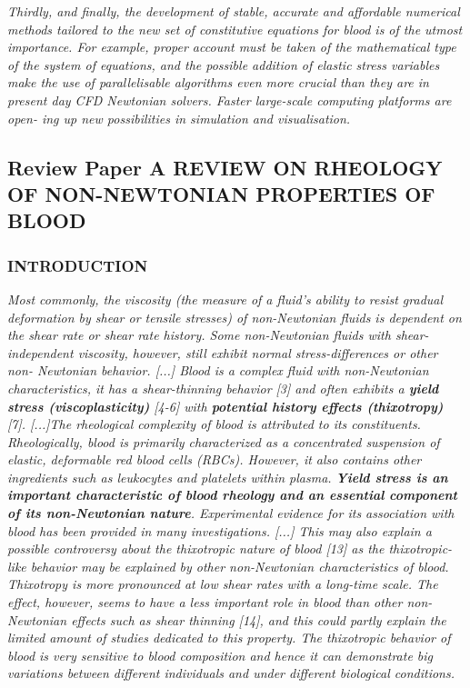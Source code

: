 \documentclass[11pt,letterpaper]{article}
\begin{document}
\textit{Thirdly, and finally, the development of stable, accurate and affordable numerical methods tailored to the new set of constitutive equations for blood is of the utmost importance. For example, proper account must be taken of the mathematical type of the system of equations, and the possible addition of elastic stress variables make the use of parallelisable algorithms even more crucial than they are in present day CFD Newtonian solvers. Faster large-scale computing platforms are open- ing up new possibilities in simulation and visualisation.}


\newpage
\subsection{Review Paper A REVIEW ON RHEOLOGY OF NON-NEWTONIAN PROPERTIES OF BLOOD}
\subsubsection*{INTRODUCTION}
\textit{Most commonly, the viscosity (the measure of a fluid's ability to resist gradual deformation by shear or tensile stresses) of non-Newtonian fluids is dependent on the shear rate or shear rate history. Some non-Newtonian fluids with shear- independent viscosity, however, still exhibit normal stress-differences or other non- Newtonian behavior. [...] \newline\newline Blood is a complex fluid with non-Newtonian characteristics, it has a shear-thinning behavior [3] and often exhibits a  \textbf{yield stress (viscoplasticity)} [4-6] with  \textbf{potential history effects (thixotropy) }[7]. [...]The rheological complexity of blood is attributed to its constituents. Rheologically, blood is primarily characterized as a concentrated suspension of elastic, deformable red blood cells (RBCs). However, it also contains other ingredients such as leukocytes and platelets within plasma. \textbf{Yield stress is an important characteristic of blood rheology and an essential component of its non-Newtonian nature}. Experimental evidence for its association with blood has been provided in many investigations. [...] \newline  \newline This may also explain a possible controversy about the thixotropic nature of blood [13] as the thixotropic-like behavior may be explained by other non-Newtonian characteristics of blood. Thixotropy is more pronounced at low shear rates with a long-time scale. The effect, however, seems to have a less important role in blood than other non-Newtonian effects such as shear thinning [14], and this could partly explain the limited amount of studies dedicated to this property. The thixotropic behavior of blood is very sensitive to blood composition and hence it can demonstrate big variations between different individuals and under different biological conditions. }
\end{document}
